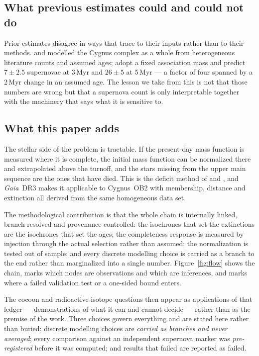 \documentclass{aa}
\begin{document}
\subsection{What previous estimates could and could not do}

Prior estimates disagree in ways that trace to their inputs rather than to their
methods. \citet{knodlseder2002} and \citet{martin2010} modelled the Cygnus
complex as a whole from heterogeneous literature counts and assumed ages;
\citet{menchiari2024} adopt a fixed association mass and predict $7\pm2.5$
supernovae at 3\,Myr and $26\pm5$ at 5\,Myr --- a factor of four spanned by a
2\,Myr change in an assumed age. The lesson we take from this is not that those
numbers are wrong but that a supernova count is only interpretable together with
the machinery that says what it is sensitive to.

\subsection{What this paper adds}

The stellar side of the problem is tractable. If the present-day mass function is
measured where it is complete, the initial mass function can be normalized there
and extrapolated above the turnoff, and the stars missing from the upper main
sequence are the ones that have died. This is the deficit method of
\citet{fuchs2006} and \citet{zucker2022}, and \textit{Gaia}~DR3 makes it
applicable to Cygnus~OB2 with membership, distance and extinction all derived
from the same homogeneous data set.

The methodological contribution is that the whole chain is internally linked,
branch-resolved and provenance-controlled: the isochrones that set the
extinctions are the isochrones that set the ages; the completeness response is
measured by injection through the actual selection rather than assumed; the
normalization is tested out of sample; and every discrete modelling choice is
carried as a branch to the end rather than marginalized into a single number.
Figure~\ref{fig:flow} shows the chain, marks which nodes are observations and
which are inferences, and marks where a failed validation test or a one-sided
bound enters.

The cocoon and radioactive-isotope questions then appear as applications of that
ledger --- demonstrations of what it can and cannot decide --- rather than as
the premise of the work. Three choices govern everything and are stated here
rather than buried: discrete modelling choices are \emph{carried as branches and
never averaged}; every comparison against an independent supernova marker was
\emph{pre-registered} before it was computed; and results that failed are
reported as failed.
\end{document}
